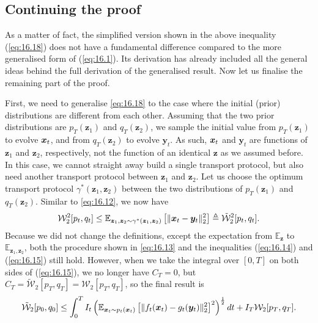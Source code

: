 \subsection{Continuing the proof}
As a matter of fact, the simplified version shown in the above inequality (\ref{eq:16.18}) does not have a fundamental difference compared to the more generalised form of (\ref{eq:16.1}). Its derivation has already included all the general ideas behind the full derivation of the generalised result. Now let us finalise the remaining part of the proof.

First, we need to generalise \cref{eq:16.18} to the case where the initial (prior) distributions are different from each other. Assuming that the two prior distributions are $p_T(\bm{z}_1)$ and $q_T(\bm{z}_2)$, we sample the initial value from $p_T(\bm{z}_1)$ to evolve $\bm{x}_{t}$, and from $q_T(\bm{z}_2)$ to evolve $\bm{y}_t$. As such, $\bm{x}_{t}$ and $\bm{y}_t$ are functions of $\bm{z}_1$ and $\bm{z}_2$, respectively, not the function of an identical $\bm{z}$ as we assumed before. In this case, we cannot straight away build a single transport protocol, but also need another transport protocol between $\bm{z}_1$ and $\bm{z}_2$. Let us choose the optimum transport protocol $\gamma^{*}(\bm{z}_1,\bm{z}_2)$ between the two distributions of $p_T(\bm{z}_1)$ and $q_T(\bm{z}_2)$. Similar to \cref{eq:16.12}, we now have
\begin{equation}
\label{eq:16.19}
    \mathcal{W}_2^2[p_t,q_t]\leq \mathbb{E}_{\bm{z}_1,\bm{z}_2\sim\gamma^{*}(\bm{z}_1,\bm{z}_2)}\left[\|\bm{x}_{t}-\bm{y}_t\|_2^2 \right]\triangleq \tilde{\mathcal{W}}_2^2[p_t,q_t].
\end{equation}
Because we did not change the definitions, except the expectation from $\mathbb{E}_{\bm{z}}$ to $\mathbb{E}_{\bm{z}_1,\bm{z}_2}$, both the procedure shown in \cref{eq:16.13} and the inequalities (\ref{eq:16.14}) and (\ref{eq:16.15}) still hold. However, when we take the integral over $[0,T]$ on both sides of (\ref{eq:16.15}), we no longer have $C_T=0$, but $C_T=\tilde{\mathcal{W}}_2[p_T,q_T]=\mathcal{W}_2[p_T,q_T]$, so the final result is 
\begin{equation}
    \label{eq:16.20}
    \tilde{\mathcal{W}}_2[p_0,q_0]\leq  \int_0^T I_t\left(\mathbb{E}_{\bm{x}_{t}\sim p_t(\bm{x}_{t})}\left[ \|f_t(\bm{x}_t)-g_t(\bm{y}_t)\|^2_2\right]^2 \right)^{\frac{1}{2}} dt +I_T\mathcal{W}_2[p_T,q_T].
\end{equation}

